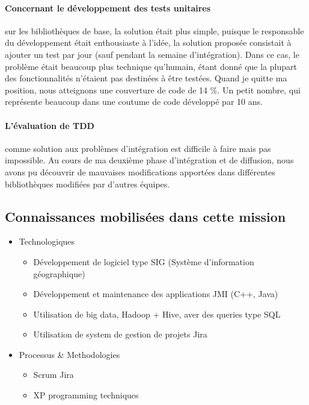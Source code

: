 \documentclass{resume} %
\begin{document}
\paragraph {Concernant le développement des tests unitaires} sur les bibliothèques  de base, la solution était plus simple, puisque le responsable du développement était enthousiaste à l'idée, la solution proposée consistait à ajouter un test par jour (sauf pendant la semaine d'intégration).
Dans ce cas, le problème était beaucoup plus technique qu'humain, étant donné que la plupart des fonctionnalités n'étaient pas destinées à être testées.
Quand je quitte ma position, nous atteignons une couverture de code de 14 \%. Un petit nombre, qui représente beaucoup dans une coutume de code développé par 10 ans.

\paragraph {L'évaluation de TDD} comme solution aux problèmes d'intégration est difficile à faire mais pas impossible. Au cours de ma deuxième phase d'intégration et de diffusion, nous avons pu découvrir de mauvaises modifications apportées dans différentes bibliothèques modifiées par d'autres équipes.

\subsection {Connaissances mobilisées dans cette mission }
	\begin{itemize} 				
			\item Technologiques 
					\begin{itemize}
						\item Développement de logiciel type SIG (Système d'information géographique)
						\item Développement et maintenance des applications JMI (C++, Java) 
						\item Utilisation de big data, Hadoop + Hive, aver des queries type SQL
						\item Utilisation de system de gestion de projets Jira
					\end {itemize}
			\item Processus \& Methodologies 
					\begin{itemize}
						\item Scrum Jira
						\item XP programming techniques
					\end {itemize}
		\end{itemize}
		
\end{document}
